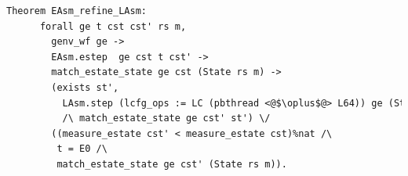 \begin{lstlisting}[language=Caml]
    Theorem EAsm_refine_LAsm:
      forall ge t cst cst' rs m, 
        genv_wf ge ->
        EAsm.estep  ge cst t cst' -> 
        match_estate_state ge cst (State rs m) ->
        (exists st',
          LAsm.step (lcfg_ops := LC (pbthread <@$\oplus$@> L64)) ge (State rs m) t st'
          /\ match_estate_state ge cst' st') \/
        ((measure_estate cst' < measure_estate cst)%nat /\
         t = E0 /\
         match_estate_state ge cst' (State rs m)).
\end{lstlisting}
%
%
%

